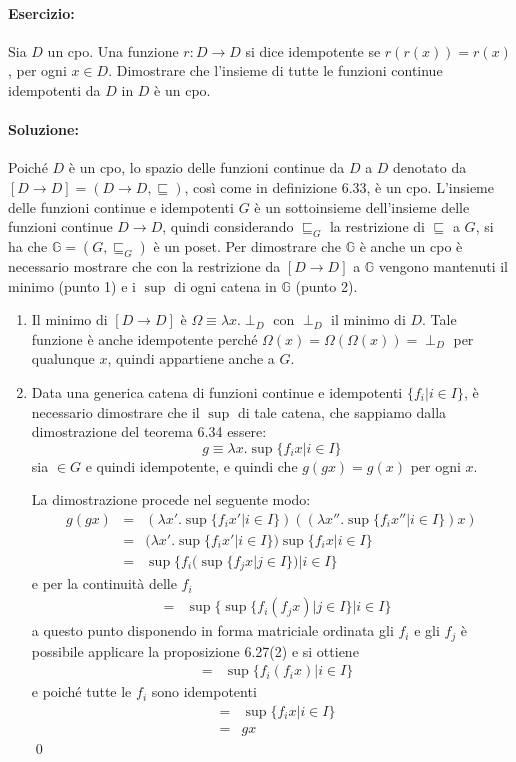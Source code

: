 \documentclass[a4paper,twosides]{report}
\begin{document}
\paragraph{Esercizio:}
Sia $D$ un cpo. Una funzione $r : D \rightarrow D$ si dice idempotente
se $r(r(x)) = r(x)$, per ogni $x \in D$.
Dimostrare che l’insieme di tutte le funzioni continue idempotenti da
$D$ in $D$ è un cpo.
\paragraph{Soluzione:}
Poich\'e $D$ \`e un cpo, lo spazio delle funzioni continue da $D$ a
$D$ denotato da $[D\rightarrow D] = (D\rightarrow D, \sqsubseteq)$,
cos\`i come in definizione 6.33, \`e un cpo. L'insieme delle funzioni
continue e idempotenti $G$ \`e un sottoinsieme dell'insieme delle funzioni
continue $D\rightarrow D$, quindi considerando $\sqsubseteq_G$ la
restrizione di $\sqsubseteq$ a $G$, si ha che $\mathbb{G} = (G,\sqsubseteq_G)$ \`e
un poset. Per dimostrare che $\mathbb{G}$ \`e anche un cpo \`e
necessario mostrare che con la restrizione da $[D\rightarrow D]$ a
$\mathbb{G}$ vengono mantenuti il minimo (punto 1) e i $\sup$ di ogni
catena in $\mathbb{G}$ (punto 2).
\begin{enumerate}
\item Il minimo di $[D\rightarrow D]$ \`e $\Omega\equiv\lambda
  x.\perp_D$ con $\perp_D$ il minimo di $D$. Tale funzione \`e anche
  idempotente perch\'e $\Omega(x)=\Omega(\Omega(x))=\perp_D$ per
  qualunque $x$, quindi appartiene anche a $G$.
\item Data una generica catena di funzioni continue e idempotenti
  $\{f_i|i\in I\}$, \`e necessario dimostrare che il $\sup$ di tale
  catena, che sappiamo dalla dimostrazione del teorema 6.34 essere:
  $$g\equiv\lambda x.\sup\{ f_i x|i\in I\}$$
  sia $\in G$ e quindi idempotente, e quindi che $g(g x)=g(x)$ per
  ogni $x$.

  La dimostrazione procede nel seguente modo:
  \begin{eqnarray*}
    g(g x)&=&(\lambda x'.\sup\{f_i x'|i\in I\})((\lambda x''.\sup\{f_i x''|i\in I\})x)\\
    &=&(\lambda x'.\sup\{f_i x'|i\in I\})\sup\{f_i x|i\in I\}\\
    &=&\sup\{f_i (\sup\{f_j x|j\in I\})|i\in I\}
  \end{eqnarray*}
  e per la continuit\`a delle $f_i$
  \begin{eqnarray*}
    &=&\sup\{\sup\{f_i (f_j x)|j\in I\}|i\in I\}
  \end{eqnarray*}
  a questo punto disponendo in forma matriciale ordinata gli $f_i$ e
  gli $f_j$ \`e possibile applicare la proposizione 6.27(2) e si
  ottiene
  \begin{eqnarray*}
    &=&\sup\{f_i(f_i x)|i\in I\}
  \end{eqnarray*}
  e poich\'e tutte le $f_i$ sono idempotenti
  \begin{eqnarray*}
    &=&\sup\{f_i x|i\in I\}\\
    &=&g x
  \end{eqnarray*}
  \qed
\end{enumerate}
\end{document}
